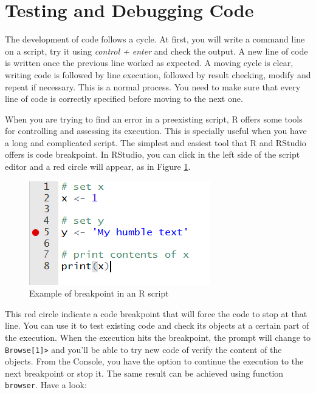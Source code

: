 \documentclass[11pt,]{book}
\begin{document}
\section{Testing and Debugging Code}\label{testing-and-debugging-code}

The development of code follows a cycle. At first, you will write a
command line on a script, try it using \emph{control + enter} and check
the output. A new line of code is written once the previous line worked
as expected. A moving cycle is clear, writing code is followed by line
execution, followed by result checking, modify and repeat if necessary.
This is a normal process. You need to make sure that every line of code
is correctly specified before moving to the next one.

When you are trying to find an error in a preexisting script, R offers
some tools for controlling and assessing its execution. This is
specially useful when you have a long and complicated script. The
simplest and easiest tool that R and RStudio offers is code breakpoint.
In RStudio, you can click in the left side of the script editor and a
red circle will appear, as in Figure \ref{fig:example-debug}.

\begin{figure}[!htbp]

{\centering \includegraphics[width=0.75\linewidth]{figs/RStudio_example_debug} 

}

\caption{Example of breakpoint in an R script}\label{fig:example-debug}
\end{figure}

This red circle indicate a code breakpoint that will force the code to
stop at that line. You can use it to test existing code and check its
objects at a certain part of the execution. When the execution hits the
breakpoint, the prompt will change to
\texttt{Browse{[}1{]}\textgreater{}} and you'll be able to try new code
of verify the content of the objects. From the Console, you have the
option to continue the execution to the next breakpoint or stop it. The
same result can be achieved using function \texttt{browser}. Have a
look:
\end{document}
